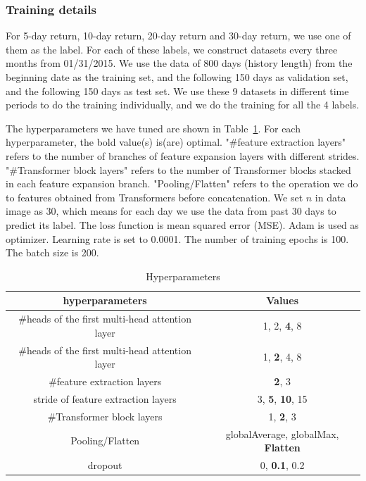 \documentclass{article}
\begin{document}
\subsubsection{Training details}
\hspace{16}For 5-day return, 10-day return, 20-day return and 30-day return, we use one of them as the label. For each of these labels, we construct datasets every three months from 01/31/2015. We use the data of 800 days (history length) from the beginning date as the training set, and the following 150 days as validation set, and the following 150 days as test set. We use these 9 datasets in different time periods to do the training individually, and we do the training for all the 4 labels.

\hspace{16}The hyperparameters we have tuned are shown in Table~\ref{tab:hyper_para}. For each hyperparameter, the bold value(s) is(are) optimal. "\#feature extraction layers" refers to the number of branches of feature expansion layers with different strides. "\#Transformer block layers" refers to the number of Transformer blocks stacked in each feature expansion branch. "Pooling/Flatten" refers to the operation we do to features obtained from Transformers before concatenation. We set $n$ in data image as 30, which means for each day we use the data from past 30 days to predict its label. The loss function is mean squared error (MSE). Adam is used as optimizer. Learning rate is set to 0.0001. The number of training epochs is 100. The batch size is 200.

\begin{table}[htb]
  \centering\small
  \caption{Hyperparameters}
  \label{tab:hyper_para}
\begin{tabular}{cc}
    \toprule
    hyperparameters & Values \\
    \midrule
    \#heads of the first multi-head attention layer & 1, 2, \textbf{4}, 8 \\
    \#heads of the first multi-head attention layer & 1, \textbf{2}, 4, 8 \\
    \#feature extraction layers & \textbf{2}, 3 \\
    stride of feature extraction layers & 3, \textbf{5}, \textbf{10}, 15 \\
    \#Transformer block layers & 1, \textbf{2}, 3 \\
    Pooling/Flatten & globalAverage, globalMax, \textbf{Flatten} \\
    dropout & 0, \textbf{0.1}, 0.2 \\
    \bottomrule
  \end{tabular}
\end{table}
\end{document}
